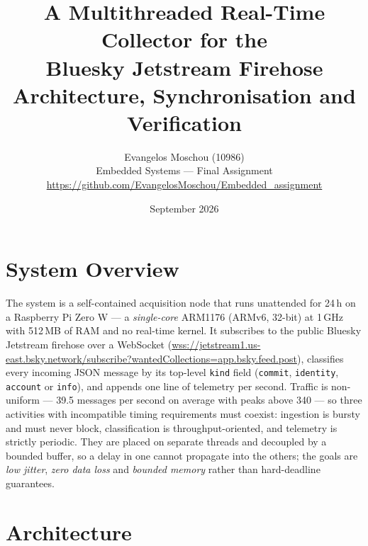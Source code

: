 \documentclass[11pt,a4paper]{article}
\title{\vspace{-1.6cm}\textbf{A Multithreaded Real-Time Collector for the\\ Bluesky Jetstream Firehose}\\[0.3em]
\large Architecture, Synchronisation and Verification}
\author{Evangelos Moschou (10986)\\[0.25em]
Embedded Systems --- Final Assignment\\[0.25em]
\small\url{https://github.com/EvangelosMoschou/Embedded_assignment}}
\date{September 2026}
\newcommand{\code}[1]{\texttt{\small #1}}
\begin{document}
\maketitle
\vspace{-1.4cm}

\section{System Overview}

The system is a self-contained acquisition node that runs unattended for 24\,h on a
Raspberry Pi Zero W --- a \emph{single-core} ARM1176 (ARMv6, 32-bit) at 1\,GHz with
512\,MB of RAM and no real-time kernel. It subscribes to the public Bluesky Jetstream
firehose over a WebSocket (\url{wss://jetstream1.us-east.bsky.network/subscribe?wantedCollections=app.bsky.feed.post}),
classifies every incoming JSON message by its top-level \code{kind} field
(\code{commit}, \code{identity}, \code{account} or \code{info}), and appends one line
of telemetry per second. Traffic is non-uniform --- 39.5 messages per second on average
with peaks above 340 --- so three activities with incompatible timing requirements must
coexist: ingestion is bursty and must never block, classification is
throughput-oriented, and telemetry is strictly periodic. They are placed on separate
threads and decoupled by a bounded buffer, so a delay in one cannot propagate into the
others; the goals are \emph{low jitter}, \emph{zero data loss} and \emph{bounded memory}
rather than hard-deadline guarantees.

\section{Architecture}
\end{document}
